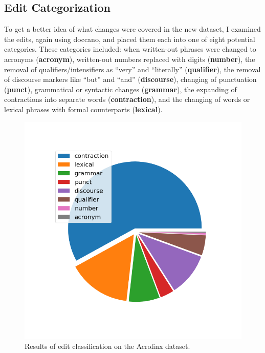 \subsection{Edit Categorization}

To get a better idea of what changes were covered in the new dataset, I examined the edits, again using doccano, and placed them each into one of eight potential categories. These categories included: when written-out phrases were changed to acronyms (\textbf{acronym}), written-out numbers replaced with digits (\textbf{number}), the removal of qualifiers/intensifiers as ``very'' and ``literally'' (\textbf{qualifier}), the removal of discourse markers like ``but'' and ``and'' (\textbf{discourse}), changing of punctuation (\textbf{punct}), grammatical or syntactic changes (\textbf{grammar}), the expanding of contractions into separate words (\textbf{contraction}), and the changing of words or lexical phrases with formal counterparts (\textbf{lexical}).

\begin{figure}
    \centering
    \includegraphics[width = 12cm]{Figures/pie_fig.png}
    \caption{Results of edit classification on the Acrolinx dataset.}
    \label{fig:doccano-edits}
\end{figure}

